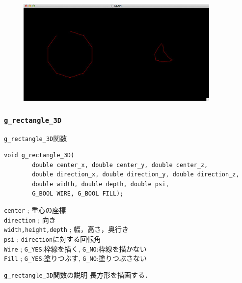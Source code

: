 \documentclass[platex,a4paper,12pt]{jsarticle}%
\begin{document}
\begin{figure}[htb]
	\includegraphics[width=100mm]{./Figures/eps/Canvas_g_polyline.eps}
\end{figure}



\clearpage
\subsubsection{\texttt{g\_rectangle\_3D}}

\begin{itembox}[l]{\texttt{g\_rectangle\_3D}関数}
\begin{verbatim}
void g_rectangle_3D(
        double center_x, double center_y, double center_z,
        double direction_x, double direction_y, double direction_z,
        double width, double depth, double psi,
        G_BOOL WIRE, G_BOOL FILL);
\end{verbatim}
\verb|center| ; 重心の座標\\
\verb|direction| ; 向き\\
\verb|width,height,depth| ; 幅，高さ，奥行き\\
\verb|psi| ; \verb|direction|に対する回転角\\
\verb|Wire| ; \verb|G_YES|:枠線を描く, \verb|G_NO|:枠線を描かない \\
\verb|Fill| ; \verb|G_YES|:塗りつぶす, \verb|G_NO|:塗りつぶさない 
\end{itembox}

\begin{itembox}[l]{\texttt{g\_rectangle\_3D}関数の説明}
長方形を描画する．
\end{itembox}
\end{document}
